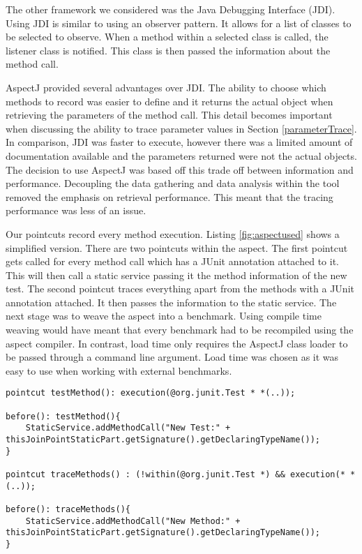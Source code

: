 The other framework we considered was the Java Debugging Interface (JDI). Using JDI is similar to using an observer pattern. It allows for a list of classes to be selected to observe. When a method within a selected class is called, the listener class is notified. This class is then passed the information about the method call. 

AspectJ provided several advantages over JDI. The ability to choose which methods to record was easier to define and it returns the actual object when retrieving the parameters of the method call. This detail becomes important when discussing the ability to trace parameter values in Section \ref{parameterTrace}. In comparison, JDI was faster to execute, however there was a limited amount of documentation available and the parameters returned were not the actual objects. The decision to use AspectJ was based off this trade off between information and performance. Decoupling the data gathering and data analysis within the tool removed the emphasis on retrieval performance. This meant that the tracing performance was less of an issue.

Our pointcuts record every method execution. Listing \ref{fig:aspectused} shows a simplified version. There are two pointcuts within the aspect. The first pointcut gets called for every method call which has a JUnit \@Test annotation attached to it. This will then call a static service passing it the method information of the new test. The second pointcut traces everything apart from the methods with a JUnit \@Test annotation attached. It then passes the information to the static service. The next stage was to weave the aspect into a benchmark. Using compile time weaving would have meant that every benchmark had to be recompiled using the aspect compiler. In contrast, load time only requires the AspectJ class loader to be passed through a command line argument. Load time was chosen as it was easy to use when working with external benchmarks.


\begin{lstlisting}[language=AspectJ, caption=A simplified pointcut within AspectJ. The first pointcut is for when a new test is executed and the second when a new method is executed., label=fig:aspectused]
pointcut testMethod(): execution(@org.junit.Test * *(..));

before(): testMethod(){
    StaticService.addMethodCall("New Test:" + thisJoinPointStaticPart.getSignature().getDeclaringTypeName());
}

pointcut traceMethods() : (!within(@org.junit.Test *) && execution(* *(..));

before(): traceMethods(){
    StaticService.addMethodCall("New Method:" + thisJoinPointStaticPart.getSignature().getDeclaringTypeName());
}
\end{lstlisting}

